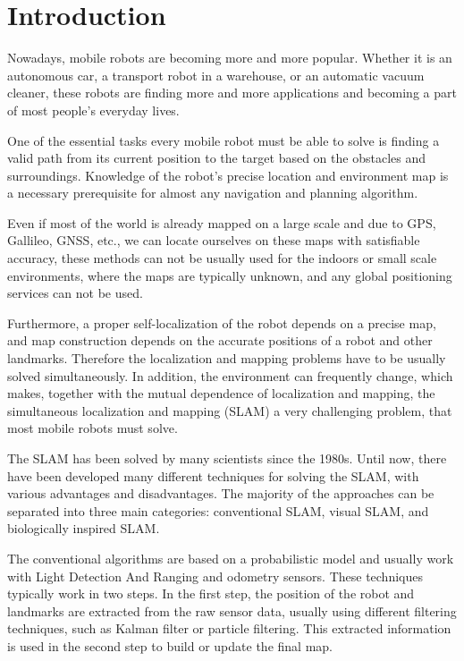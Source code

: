 \chapter{Introduction}\label{chapter:introduction}

Nowadays, mobile robots are becoming more and more popular. Whether it is an autonomous car, a transport robot in a warehouse, or an automatic vacuum cleaner, these robots are finding more and more applications and becoming a part of most people's everyday lives.\par
One of the essential tasks every mobile robot must be able to solve is finding a valid path from its current position to the target based on the obstacles and surroundings. Knowledge of the robot's precise location and environment map is a necessary prerequisite for almost any navigation and planning algorithm.\par
Even if most of the world is already mapped on a large scale and due to GPS, Gallileo, GNSS, etc., we can locate ourselves on these maps with satisfiable accuracy, these methods can not be usually used for the indoors or small scale environments, where the maps are typically unknown, and any global positioning services can not be used.\par
Furthermore, a proper self-localization of the robot depends on a precise map, and map construction depends on the accurate positions of a robot and other landmarks. Therefore the localization and mapping problems have to be usually solved simultaneously. In addition, the environment can frequently change, which makes, together with the mutual dependence of localization and mapping, the simultaneous localization and mapping (SLAM) a very challenging problem, that most mobile robots must solve.\par
The SLAM has been solved by many scientists since the 1980s. Until now, there have been developed many different techniques for solving the SLAM, with various advantages and disadvantages. The majority of the approaches can be separated into three main categories: conventional SLAM, visual SLAM, and biologically inspired SLAM.\par
The conventional algorithms are based on a probabilistic model and usually work with Light Detection And Ranging \cite{LiDar} and odometry sensors. These techniques typically work in two steps. In the first step, the position of the robot and landmarks are extracted from the raw sensor data, usually using different filtering techniques, such as Kalman filter or particle filtering. This extracted information is used in the second step to build or update the final map.\cite{convSLAM}\par
